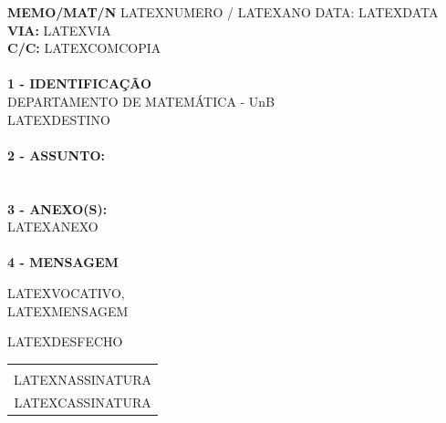 \documentclass[12pt]{artigo}
\begin{document}
\vspace*{.8cm}
\timbrado
\setlength{\baselineskip}{5mm}
\noindent 
\begin{minipage}{16cm}
\vspace*{-8mm}
\parindent=1.2cm
\setlength{\baselineskip}{5mm}
\vspace*{.2cm}
\noindent
\small
{\bf  MEMO/MAT/N\primo} LATEXNUMERO / LATEXANO \hfill {DATA:} {LATEXDATA}
\vum \\
{\bf VIA:} {LATEXVIA}  
\\
{\bf C/C:} {LATEXCOMCOPIA}  
\\
\mbox{} \hrulefill\
\\
{\bf 1 - IDENTIFICA\c{C}\~AO} 
\\
\phantom{xxx}{\bf Proced\^encia:} {DEPARTAMENTO DE MATEM\'ATICA - UnB}
\\
 {LATEXDESTINO}
\\
\mbox{} \hrulefill\
\\
{\bf 2 - ASSUNTO:} \\
\phantom{xxx}{LATEXASSUNTO}
\\
\mbox{} \hrulefill\
\\
{\bf 3 - ANEXO(S):} 
\\
\phantom{xxx} {LATEXANEXO}
\\
\mbox{} \hrulefill\
\\
{ \bf 4 - MENSAGEM} 
\end{minipage}
\setlength{\baselineskip}{5mm}
\vspace*{.92cm} 

LATEXVOCATIVO,
\vspace*{8mm} \\
\noindent 
LATEXMENSAGEM 
\vspace*{8mm} 
\hspace*{8cm} 
\setlength{\baselineskip}{5mm}
\vspace*{10mm} 

LATEXDESFECHO
\vspace*{15mm} \\
\begin{center} 
\begin{tabular}{c}
\hline \vspace*{-3mm}\\
LATEXNASSINATURA \\
{\small LATEXCASSINATURA}
%
\end{tabular} 
\end{center}
\end{document}
